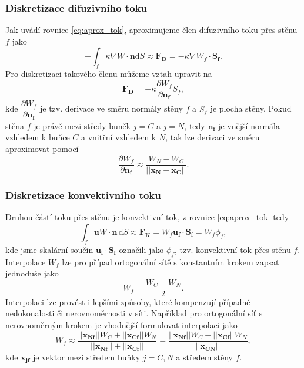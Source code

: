 \subsubsection{Diskretizace difuzivního toku}
Jak uvádí rovnice \ref{eq:aprox_tok}, aproximujeme člen difuzivního toku přes stěnu $f$ jako
\begin{equation}
-\int_f \kappa \nabla W \cdot \mathbf{n}\mathrm{d}S \approx \mathbf{F_D} = -\kappa \nabla W_f \cdot \mathbf{S_f}.
\end{equation}
Pro diskretizaci takového členu můžeme vztah upravit na
\begin{equation}
\mathbf{F_D} = -\kappa \dfrac{\partial W_f}{\partial \mathbf{n_f}} S_f,
\end{equation}
kde $\dfrac{\partial W_f}{\partial \mathbf{n_f}}$ je tzv. derivace ve směru normály stěny $f$ a $S_f$ je plocha stěny. Pokud stěna $f$ je právě mezi středy buněk $ j=C $ a $ j=N $, tedy $ \mathbf{n_f} $ je vnější normála vzhledem k buňce $ C $ a vnitřní vzhledem k $ N $, tak lze derivaci ve směru aproximovat pomocí 
\begin{equation}
\dfrac{\partial W_f}{\partial \mathbf{n_f}} \approx \dfrac{W_N-W_C}{||\mathbf{x_N}-\mathbf{x_C}||}.
\end{equation}

\subsubsection{Diskretizace konvektivního toku}
Druhou částí toku přes stěnu je konvektivní tok, z rovnice \ref{eq:aprox_tok} tedy
\begin{equation}
\int_f \mathbf{u}W\cdot \mathbf{n}\, \mathrm{d}S
\approx
\mathbf{F_K}
=
W_f \mathbf{u_f}\cdot \mathbf{S_f}=W_f\phi_f,
\end{equation}
kde jsme skalární součin $ \mathbf{u_f}\cdot \mathbf{S_f} $ označili jako $ \phi_f $, tzv. konvektivní tok přes stěnu $ f $. Interpolace $ W_f $ lze pro případ ortogonální sítě s konstantním krokem zapsat jednoduše jako
\begin{equation}\label{eq:konv_linterp}
W_f = \dfrac{W_C+W_N}{2}.
\end{equation}
Interpolaci lze provést i lepšími způsoby, které kompenzují případné nedokonalosti či nerovnoměrnosti v síti. Například pro ortogonální síť s nerovnoměrným krokem je vhodnější formulovat interpolaci jako
\begin{equation}
W_f \approx \dfrac{||\mathbf{x_{Nf}}|| W_C + ||\mathbf{x_{Cf}}|| W_N }
{||\mathbf{x_{Nf}}|| + ||\mathbf{x_{Cf}}||}
= 
\dfrac{||\mathbf{x_{Nf}}|| W_C + ||\mathbf{x_{Cf}}|| W_N }
{||\mathbf{x_{CN}}||},
\end{equation}
kde $ \mathbf{x_{jf}} $ je vektor mezi středem buňky $ j=C,N $ a středem stěny $ f $.

